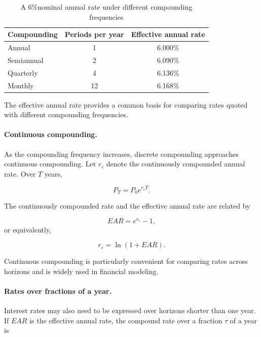 \begin{table}[H]
\centering
\caption{A 6\%nominal annual rate under different compounding frequencies}
\label{tab:ch6-compounding-frequency}

\begin{tabular}{@{}l c c@{}}
\toprule
\textbf{Compounding} & \textbf{Periods per year} & \textbf{Effective annual rate} \\
\midrule
Annual & 1 & 6.000\% \\
Semiannual & 2 & 6.090\% \\
Quarterly & 4 & 6.136\% \\
Monthly & 12 & 6.168\% \\
\bottomrule
\end{tabular}
\end{table}

The effective annual rate provides a common basis for comparing rates quoted with different compounding frequencies.
\paragraph{Continuous compounding.}

As the compounding frequency increases, discrete compounding approaches continuous compounding. Let $r_c$ denote the continuously compounded annual rate. Over $T$ years,

\begin{equation}
P_T=P_0 e^{r_c T}.
\label{eq:ch6-continuous-compounding}
\end{equation}

The continuously compounded rate and the effective annual rate are related by

\begin{equation}
EAR=e^{r_c}-1,
\label{eq:ch6-continuous-to-ear}
\end{equation}
or equivalently,

\begin{equation}
r_c=\ln(1+EAR).
\label{eq:ch6-ear-to-continuous}
\end{equation}

Continuous compounding is particularly convenient for comparing rates across horizons and is widely used in financial modeling.

\paragraph{Rates over fractions of a year.}

Interest rates may also need to be expressed over horizons shorter than one year. If $EAR$ is the effective annual rate, the compound rate over a fraction $\tau$ of a year is

